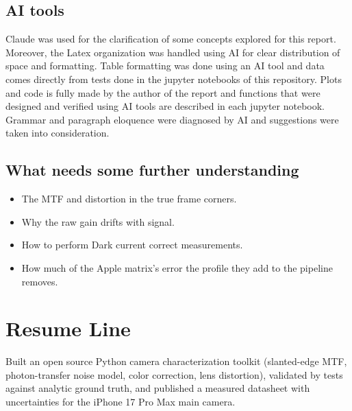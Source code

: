 \documentclass[9pt]{extarticle}
\begin{document}
\subsection{AI tools}
Claude was used for the clarification of some concepts explored for this report. Moreover, the Latex organization was handled using AI for clear distribution of space and formatting. Table formatting was done using an AI tool and data comes directly from tests done in the jupyter notebooks of this repository. Plots and code is fully made by the author of the report and functions that were designed and verified using AI tools are described in each jupyter notebook. Grammar and paragraph eloquence were diagnosed by AI and suggestions were taken into consideration.

\subsection{What needs some further understanding}
\begin{itemize}
\item The MTF and distortion in the true frame corners.
\item Why the raw gain drifts with signal.
\item How to perform Dark current correct measurements.
\item How much of the Apple matrix's error the profile they add to the pipeline removes.
\end{itemize}

\section*{Resume Line}
Built an open source Python camera characterization toolkit (slanted-edge MTF, photon-transfer noise model, color correction, lens distortion), validated by tests against analytic ground truth, and published a measured datasheet with uncertainties for the iPhone 17 Pro Max main camera.
\end{document}
